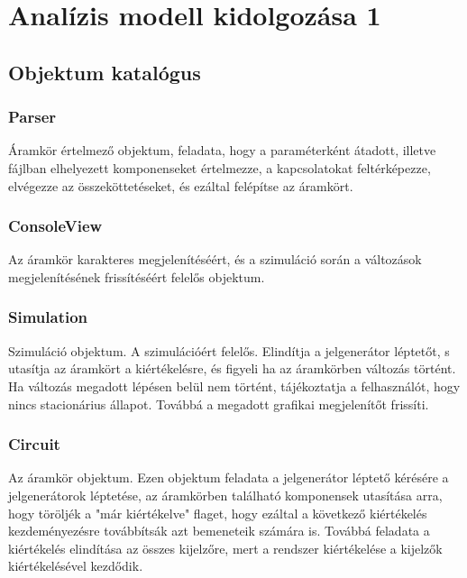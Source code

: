 %
\chapter{Analízis modell kidolgozása 1}

\thispagestyle{fancy}

\section{Objektum katalógus}

\subsection{\bf Parser}
Áramkör értelmező objektum, feladata, hogy a paraméterként átadott, illetve fájlban elhelyezett komponenseket értelmezze, a kapcsolatokat feltérképezze, elvégezze az összeköttetéseket, és ezáltal felépítse az áramkört.

\subsection{\bf ConsoleView}
Az áramkör karakteres megjelenítéséért, és a szimuláció során a változások megjelenítésének frissítéséért felelős objektum.

\subsection{\bf Simulation}
Szimuláció objektum. A szimulációért felelős. Elindítja a jelgenerátor léptetőt, s utasítja az áramkört a kiértékelésre, és figyeli ha az áramkörben változás történt. Ha változás megadott lépésen belül nem történt, tájékoztatja a felhasználót, hogy nincs stacionárius állapot. Továbbá a megadott grafikai megjelenítőt frissíti.

\subsection{\bf Circuit}
Az áramkör objektum. Ezen objektum feladata a jelgenerátor léptető kérésére a jelgenerátorok léptetése, az áramkörben található komponensek utasítása arra, hogy töröljék a "már kiértékelve" flaget, hogy ezáltal a következő kiértékelés kezdeményezésre továbbítsák azt bemeneteik számára is.
Továbbá feladata a kiértékelés elindítása az összes kijelzőre, mert a rendszer kiértékelése a kijelzők kiértékelésével kezdődik.



